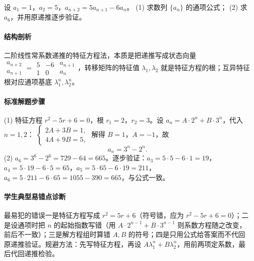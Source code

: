 \begin{problem}
设 $a_1=1$，$a_2=5$，$a_{n+2}=5a_{n+1}-6a_n$。
(1) 求数列 $\{a_n\}$ 的通项公式；
(2) 求 $a_6$，并用原递推逐步验证。
\end{problem}
\begin{solution}
\paragraph{结构剖析}
二阶线性常系数递推的特征方程法，本质是把递推写成状态向量 $\begin{smallmatrix}a_{n+2}\\a_{n+1}\end{smallmatrix}=\begin{smallmatrix}5&-6\\1&0\end{smallmatrix}\begin{smallmatrix}a_{n+1}\\a_n\end{smallmatrix}$，转移矩阵的特征值 $\lambda_1,\lambda_2$ 就是特征方程的根；互异特征根对应通项基底 $\lambda_1^n,\lambda_2^n$。
\paragraph{标准解题步骤}
(1) 特征方程 $r^2-5r+6=0$，根 $r_1=2$，$r_2=3$。设 $a_n=A\cdot2^n+B\cdot3^n$，代入 $n=1,2$：
$\begin{cases}2A+3B=1,\\4A+9B=5,\end{cases}$
解得 $B=1$，$A=-1$，故
$$a_n=3^n-2^n.$$
(2) $a_6=3^6-2^6=729-64=665$。逐步验证：$a_3=5\cdot5-6\cdot1=19$，$a_4=5\cdot19-6\cdot5=65$，$a_5=5\cdot65-6\cdot19=211$，$a_6=5\cdot211-6\cdot65=1055-390=665$，与公式一致。
\paragraph{学生典型易错点诊断}
最易犯的错误一是特征方程写成 $r^2=5r+6$（符号错，应为 $r^2-5r+6=0$）；二是设通项时把 $n$ 的起始指数写错（用 $A\cdot2^{n-1}+B\cdot3^{n-1}$ 则系数方程随之改变，前后不一致）；三是解方程组时算错 $A,B$ 的符号；四是只用公式给答案而不代回原递推验证。规避方法：先写特征方程，再设 $A\lambda_1^n+B\lambda_2^n$，用前两项定系数，最后代回递推检验。
\end{solution}

